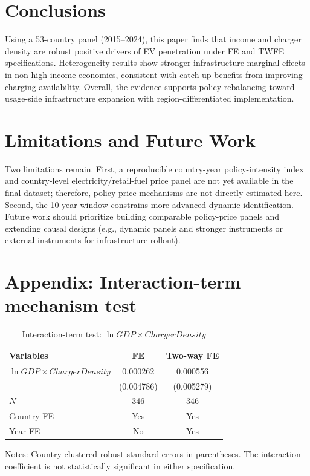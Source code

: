 \documentclass[a4paper,12pt]{article}
\begin{document}
\section{Conclusions}
Using a 53-country panel (2015--2024), this paper finds that income and charger density are robust positive drivers of EV penetration under FE and TWFE specifications. Heterogeneity results show stronger infrastructure marginal effects in non-high-income economies, consistent with catch-up benefits from improving charging availability. Overall, the evidence supports policy rebalancing toward usage-side infrastructure expansion with region-differentiated implementation.

\section{Limitations and Future Work}
Two limitations remain. First, a reproducible country-year policy-intensity index and country-level electricity/retail-fuel price panel are not yet available in the final dataset; therefore, policy-price mechanisms are not directly estimated here. Second, the 10-year window constrains more advanced dynamic identification. Future work should prioritize building comparable policy-price panels and extending causal designs (e.g., dynamic panels and stronger instruments or external instruments for infrastructure rollout).

\appendix
\section{Appendix: Interaction-term mechanism test}
\begin{table}[H]
\centering
\caption{Interaction-term test: $\ln GDP \times ChargerDensity$}
\label{tab:appendix_interaction}
\begin{threeparttable}
\begin{tabular}{lcc}
\toprule
Variables & FE & Two-way FE \\
\midrule
$\ln GDP \times ChargerDensity$ & 0.000262 & 0.000556 \\
 & (0.004786) & (0.005279) \\
\midrule
$N$ & 346 & 346 \\
Country FE & Yes & Yes \\
Year FE & No & Yes \\
\bottomrule
\end{tabular}
\begin{tablenotes}
\footnotesize
\item Notes: Country-clustered robust standard errors in parentheses. The interaction coefficient is not statistically significant in either specification.
\end{tablenotes}
\end{threeparttable}
\end{table}
\end{document}
